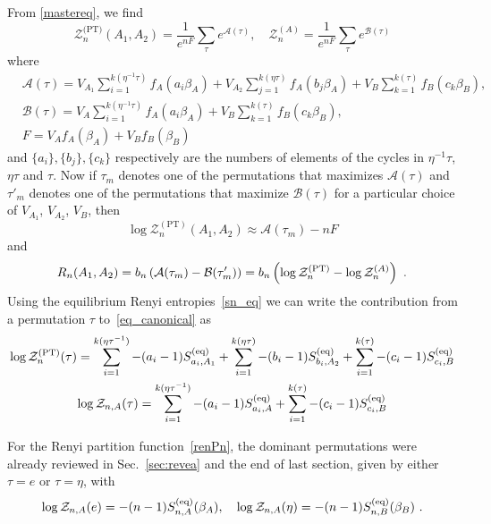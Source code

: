 \documentclass[a4paper,11pt]{article}
\newcommand{\Zpt}{\sZ_n^{(\text{PT})}}
\newcommand{\be}{\begin{equation}}
\newcommand{\ee}{\end{equation}}
\newcommand{\bega}{\begin{gather}}
\def\b{{\beta}}
\def\le{\left}
\def\ri{\right}
\newcommand\sA{{\ensuremath{{\mathcal A}}}}
\newcommand\sB{{\ensuremath{{\mathcal B}}}}
\newcommand\sZ{{\mathcal Z}}
\begin{document}
From \eqref{mastereq}, we find 
\be 
 \sZ_n^{\text{(PT)}}(A_1, A_2) = \frac{1}{e^{nF}} \sum_{\tau} e^{ \sA(\tau)}, \quad \sZ_n^{(A)} = \frac{1}{e^{n F}} \sum_{\tau} e^{\sB(\tau)}
 \label{eq_canonical}
\ee
where %
\begin{align} 
\label{defAs}
&\sA(\tau)= V_{A_1} \sum_{i=1}^{k(\eta^{-1}\tau)} f_A(a_i\beta_A)+ V_{A_2} \sum_{j=1}^{k(\eta\tau)} f_A(b_j\beta_A) + V_B \sum_{k=1}^{k(\tau)} f_B(c_k\beta_B), \\
\label{defBs} 
& \sB(\tau)= V_A \sum_{i=1}^{k(\eta^{-1}\tau)}f_A(a_i \beta_A) + V_B \sum_{k=1}^{k(\tau)} f_B(c_k \beta_B),\\
& F = V_A f_A (\b_A)+ V_B f_B (\b_B)
\end{align} 
and $\{a_i\}, \{b_j\}, \{c_k\}$ respectively are the numbers of elements of the cycles in $\eta^{-1}\tau$, $\eta\tau$ and $\tau$. 
Now if $\tau_m$ denotes one of the permutations that maximizes $\sA(\tau)$ and $\tau'_m$ denotes one of the permutations that maximize $\sB(\tau)$ for a particular choice of $V_{A_1}$, $V_{A_2}$, $V_B$, then 
\be 
\log \Zpt(A_1, A_2) \approx \sA(\tau_m) -n F 
\ee
and 
\be 
R_n(A_1, A_2) = b_n \left(\sA(\tau_m)- \sB(\tau'_m) \right)
= b_n \le(\log \sZ_n^{\rm (PT)} - \log \sZ_n^{(A)} \ri) \ .
\ee
Using the equilibrium Renyi entropies~\eqref{sn_eq} we can write the contribution from a permutation $\tau$ to~\eqref{eq_canonical} as 
\bega \label{canonical_gen}
 \log \sZ_n^{\rm (PT)}(\tau) = \sum_{i=1}^{k(\eta \tau^{-1})} -(a_i-1) S_{a_i, A_1}^{\rm (eq)} + \sum_{i=1}^{k(\eta \tau)} -(b_i-1) S_{b_i, A_2}^{\rm (eq)} + \sum_{i=1}^{k(\tau)} -(c_i -1) S_{c_i, B}^{\rm (eq)} \\
\log \sZ_{n,A} (\tau) = \sum_{i=1}^{k(\eta \tau^{-1})} -(a_i-1) S_{a_i, A}^{\rm (eq)} + \sum_{i=1}^{k(\tau)} -(c_i -1) S_{c_i, B}^{\rm (eq)} 
\label{renPn}
 \end{gather} 



For the Renyi partition function~\eqref{renPn}, the dominant permutations were already reviewed in Sec.~\ref{sec:revea} and the end of last section, given by either $\tau = e$ or $\tau = \eta$, 
with 
\be 
\log \sZ_{n,A} (e) = - (n-1) S_{n, A}^{\rm (eq)} (\b_A) , \quad \log \sZ_{n,A} (\eta) = - (n-1) S_{n, B}^{\rm (eq)} (\b_B ) \ . 
\ee
\end{document}
